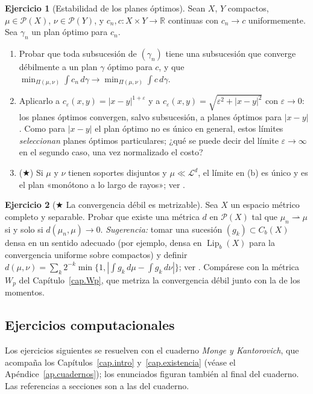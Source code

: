 \documentclass[12pt, a4paper]{amsbook}
\newcommand{\ve}{\varepsilon}
\newcommand{\R}{{\mathbb R}}
\newcommand{\LL}{{\mathcal L}}
\theoremstyle{remark}
\theoremstyle{definition}
\newtheorem{ejercicio}{Ejercicio}[chapter]
\numberwithin{section}{chapter}
\numberwithin{subsection}{section}
\numberwithin{equation}{section}
\numberwithin{figure}{chapter}
\begin{document}
\begin{ejercicio}[Estabilidad de los planes óptimos]\label{ejer.estabilidad.costos}
Sean $X$, $Y$ compactos, $\mu\in\mathcal P(X)$, $\nu\in\mathcal P(Y)$, y
$c_n,c\colon X\times Y\to\R$ continuas con $c_n\to c$ uniformemente. Sea
$\gamma_n$ un plan óptimo para $c_n$.
\begin{enumerate}[label=(\alph*)]
\item Probar que toda subsucesión de $(\gamma_n)$ tiene una subsucesión que
converge débilmente a un plan $\gamma$ óptimo para $c$, y que
$\min_{\Pi(\mu,\nu)}\int c_n\,d\gamma\to\min_{\Pi(\mu,\nu)}\int c\,d\gamma$.
\item Aplicarlo a $c_\ve(x,y)=|x-y|^{1+\ve}$ y a
$c_\ve(x,y)=\sqrt{\ve^2+|x-y|^2}$ con $\ve\to0$: los planes óptimos
convergen, salvo subsucesión, a planes óptimos para $|x-y|$. Como para
$|x-y|$ el plan óptimo no es único en general, estos límites
\emph{seleccionan} planes óptimos particulares; ¿qué se puede decir del
límite $\ve\to\infty$ en el segundo caso, una vez normalizado el costo?
\item ($\bigstar$) Si $\mu$ y $\nu$ tienen soportes disjuntos y
$\mu\ll\LL^d$, el límite en (b) es único y es el plan «monótono a lo largo
de rayos»; ver \cite[Sec.~3.1]{Santambrogio}.
\end{enumerate}
\end{ejercicio}

\begin{ejercicio}[$\bigstar$ La convergencia débil es metrizable]\label{ejer.debil.metrizable}
Sea $X$ un espacio métrico completo y separable. Probar que existe una
métrica $d$ en $\mathcal P(X)$ tal que $\mu_n\rightharpoonup\mu$ si y solo
si $d(\mu_n,\mu)\to0$. \emph{Sugerencia:} tomar una sucesión
$(g_k)\subset C_b(X)$ densa en un sentido adecuado (por ejemplo, densa en
$\operatorname{Lip}_b(X)$ para la convergencia uniforme sobre compactos) y
definir $d(\mu,\nu)=\sum_k2^{-k}\min\{1,|\int g_k\,d\mu-\int g_k\,d\nu|\}$;
ver \cite[Sec.~5.1]{AGS2008}. Compárese con la métrica $W_p$ del
Capítulo~\ref{cap.Wp}, que metriza la convergencia débil junto con la de
los momentos.
\end{ejercicio}

\subsection*{Ejercicios computacionales}

Los ejercicios siguientes se resuelven con el cuaderno \emph{Monge y
Kantorovich}, que acompaña los Capítulos~\ref{cap.intro} y~\ref{cap.existencia}
(véase el Apéndice~\ref{ap.cuadernos}); los enunciados figuran también al
final del cuaderno. Las referencias a secciones son a las del cuaderno.
\end{document}
